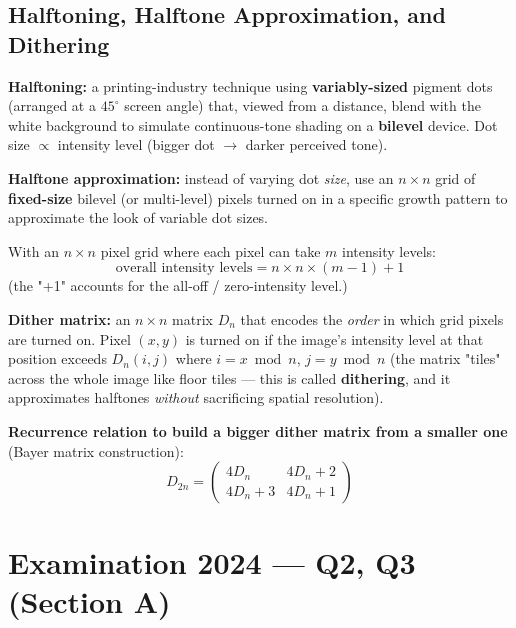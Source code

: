 \documentclass[12pt, a4paper]{article}
\newenvironment{answerbox}{\begin{mdframed}[style=answerframe]}{\end{mdframed}}
\begin{document}
\subsection{Halftoning, Halftone Approximation, and Dithering}
\begin{keypoints}
  \item \textbf{Halftoning:} a printing-industry technique using \textbf{variably-sized} pigment dots (arranged at a $45^\circ$ screen angle) that, viewed from a distance, blend with the white background to simulate continuous-tone shading on a \textbf{bilevel} device. Dot size $\propto$ intensity level (bigger dot $\to$ darker perceived tone).
  \item \textbf{Halftone approximation:} instead of varying dot \emph{size}, use an $n\times n$ grid of \textbf{fixed-size} bilevel (or multi-level) pixels turned on in a specific growth pattern to approximate the look of variable dot sizes.
  \begin{answerbox}
  With an $n\times n$ pixel grid where each pixel can take $m$ intensity levels: $$\text{overall intensity levels} = n\times n\times(m-1) + 1$$ (the "+1" accounts for the all-off / zero-intensity level.)
  \end{answerbox}
  \item \textbf{Dither matrix:} an $n\times n$ matrix $D_n$ that encodes the \emph{order} in which grid pixels are turned on. Pixel $(x,y)$ is turned on if the image's intensity level at that position exceeds $D_n(i,j)$ where $i = x \bmod n$, $j = y \bmod n$ (the matrix "tiles" across the whole image like floor tiles — this is called \textbf{dithering}, and it approximates halftones \emph{without} sacrificing spatial resolution).
  \item \textbf{Recurrence relation to build a bigger dither matrix from a smaller one} (Bayer matrix construction):
  $$D_{2n} = \begin{pmatrix} 4D_n & 4D_n+2 \\ 4D_n+3 & 4D_n+1 \end{pmatrix}$$
\end{keypoints}

\section{Examination 2024 --- Q2, Q3 (Section A)}
\end{document}
